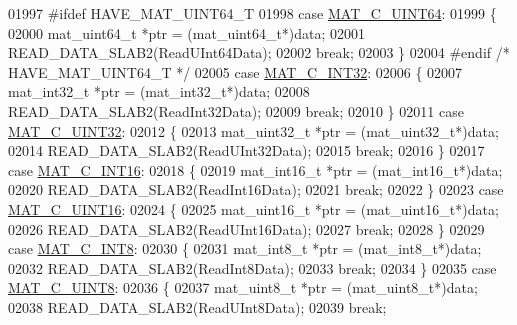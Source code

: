 \begin{DoxyCode}
{{{{{{{{{01997 \textcolor{preprocessor}{#ifdef HAVE\_MAT\_UINT64\_T}
01998         \textcolor{keywordflow}{case} \hyperlink{group___m_a_t_ggad4d60ae7b709fc81bfd744fb4c857c40a86470e25c3763d9a24623f04326195dd}{MAT\_C\_UINT64}:
01999         \{
02000             mat\_uint64\_t *ptr = (mat\_uint64\_t*)data;
02001             READ\_DATA\_SLAB2(ReadUInt64Data);
02002             \textcolor{keywordflow}{break};
02003         \}
02004 \textcolor{preprocessor}{#endif }\textcolor{comment}{/* HAVE\_MAT\_UINT64\_T */}\textcolor{preprocessor}{}
02005         \textcolor{keywordflow}{case} \hyperlink{group___m_a_t_ggad4d60ae7b709fc81bfd744fb4c857c40adb44fc39694e3152ae5e69470a2fefe8}{MAT\_C\_INT32}:
02006         \{
02007             mat\_int32\_t *ptr = (mat\_int32\_t*)data;
02008             READ\_DATA\_SLAB2(ReadInt32Data);
02009             \textcolor{keywordflow}{break};
02010         \}
02011         \textcolor{keywordflow}{case} \hyperlink{group___m_a_t_ggad4d60ae7b709fc81bfd744fb4c857c40a9a17a7edd45b19ef68197db81b27e816}{MAT\_C\_UINT32}:
02012         \{
02013             mat\_uint32\_t *ptr = (mat\_uint32\_t*)data;
02014             READ\_DATA\_SLAB2(ReadUInt32Data);
02015             \textcolor{keywordflow}{break};
02016         \}
02017         \textcolor{keywordflow}{case} \hyperlink{group___m_a_t_ggad4d60ae7b709fc81bfd744fb4c857c40a40370e9de516c5036a67a5865c071006}{MAT\_C\_INT16}:
02018         \{
02019             mat\_int16\_t *ptr = (mat\_int16\_t*)data;
02020             READ\_DATA\_SLAB2(ReadInt16Data);
02021             \textcolor{keywordflow}{break};
02022         \}
02023         \textcolor{keywordflow}{case} \hyperlink{group___m_a_t_ggad4d60ae7b709fc81bfd744fb4c857c40a8bede21dbf6c1edc0bbccc1481bccae7}{MAT\_C\_UINT16}:
02024         \{
02025             mat\_uint16\_t *ptr = (mat\_uint16\_t*)data;
02026             READ\_DATA\_SLAB2(ReadUInt16Data);
02027             \textcolor{keywordflow}{break};
02028         \}
02029         \textcolor{keywordflow}{case} \hyperlink{group___m_a_t_ggad4d60ae7b709fc81bfd744fb4c857c40a984ff310f9e906100fcff95f704f43c5}{MAT\_C\_INT8}:
02030         \{
02031             mat\_int8\_t *ptr = (mat\_int8\_t*)data;
02032             READ\_DATA\_SLAB2(ReadInt8Data);
02033             \textcolor{keywordflow}{break};
02034         \}
02035         \textcolor{keywordflow}{case} \hyperlink{group___m_a_t_ggad4d60ae7b709fc81bfd744fb4c857c40a81270f8093cb4808e992c1d29d84d4e3}{MAT\_C\_UINT8}:
02036         \{
02037             mat\_uint8\_t *ptr = (mat\_uint8\_t*)data;
02038             READ\_DATA\_SLAB2(ReadUInt8Data);
02039             \textcolor{keywordflow}{break};
}}}}}}}}}
\end{DoxyCode}
